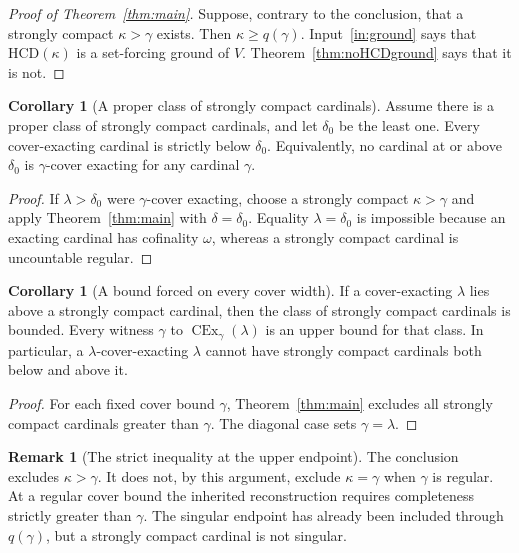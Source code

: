 \documentclass[11pt,letterpaper]{article}
\theoremstyle{definition}
\newtheorem{corollary}[definition]{Corollary}
\newtheorem{remark}[definition]{Remark}
\numberwithin{equation}{section}
\newcommand{\HCD}{\mathrm{HCD}}
\newcommand{\CEx}{\operatorname{CEx}}
\begin{document}
\begin{proof}[Proof of Theorem~\ref{thm:main}]
Suppose, contrary to the conclusion, that a strongly compact
$\kappa>\gamma$ exists. Then $\kappa\ge q(\gamma)$.
Input~\ref{in:ground} says that $\HCD(\kappa)$ is a set-forcing ground
of $V$. Theorem~\ref{thm:noHCDground} says that it is not.
\end{proof}

\begin{corollary}[A proper class of strongly compact cardinals]\label{cor:properclass}
Assume there is a proper class of strongly compact cardinals, and let
$\delta_0$ be the least one. Every cover-exacting cardinal is strictly
below $\delta_0$. Equivalently, no cardinal at or above $\delta_0$ is
$\gamma$-cover exacting for any cardinal $\gamma$.
\end{corollary}
\begin{proof}
If $\lambda>\delta_0$ were $\gamma$-cover exacting, choose a strongly
compact $\kappa>\gamma$ and apply Theorem~\ref{thm:main} with
$\delta=\delta_0$. Equality $\lambda=\delta_0$ is impossible because
an exacting cardinal has cofinality $\omega$, whereas a strongly
compact cardinal is uncountable regular.
\end{proof}

\begin{corollary}[A bound forced on every cover width]\label{cor:bound}
If a cover-exacting $\lambda$ lies above a strongly compact cardinal,
then the class of strongly compact cardinals is bounded. Every witness
$\gamma$ to $\CEx_\gamma(\lambda)$ is an upper bound for that class.
In particular, a $\lambda$-cover-exacting $\lambda$ cannot have strongly
compact cardinals both below and above it.
\end{corollary}
\begin{proof}
For each fixed cover bound $\gamma$, Theorem~\ref{thm:main} excludes
all strongly compact cardinals greater than $\gamma$. The diagonal
case sets $\gamma=\lambda$.
\end{proof}

\begin{remark}[The strict inequality at the upper endpoint]
The conclusion excludes $\kappa>\gamma$. It does not, by this
argument, exclude $\kappa=\gamma$ when $\gamma$ is regular. At a regular
cover bound the inherited reconstruction requires completeness strictly
greater than $\gamma$. The singular endpoint has already been included
through $q(\gamma)$, but a strongly compact cardinal is not singular.
\end{remark}
\end{document}

